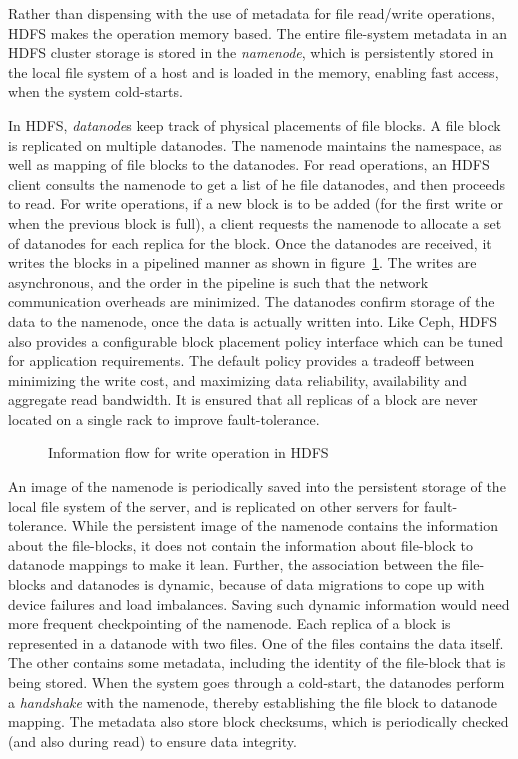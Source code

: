 Rather than dispensing with the use of metadata for file read/write operations, HDFS makes the operation memory based.
The entire file-system metadata in an HDFS cluster storage is stored in the {\em namenode}, which is persistently stored
in the local file system of a host and is loaded in the memory, enabling fast access, when the system cold-starts. 

In HDFS, {\em datanode}s keep track of physical placements of file blocks. A file block is replicated on multiple datanodes.  
The namenode maintains the namespace, as well as mapping of file blocks to the datanodes. For read operations, an HDFS client 
consults the namenode to get a list of he file datanodes, and then proceeds to read. For write operations, if a new block is
to be added (for the first write or when the previous block is full), a client requests the namenode to allocate a set of 
datanodes for each replica for the block. Once the datanodes are received, it writes the blocks in 
a pipelined manner as shown in figure~\ref{fig:bigdata:hdfs}. The writes are asynchronous, and the order in the pipeline is
such that the network communication overheads are minimized. The datanodes confirm storage of the data to the namenode,
once the data is actually written into. Like Ceph, HDFS also provides a configurable block placement policy interface which 
can be tuned for application requirements. The default policy provides a tradeoff between minimizing the write cost, and 
maximizing data reliability, availability and aggregate read bandwidth. It is ensured that all replicas of a block are never 
located on a single rack to improve fault-tolerance.

\begin{figure}[htbp!]
	\centerline{
	}
	\caption{Information flow for write operation in HDFS} 
	\label{fig:bigdata:hdfs}
\end{figure}


An image of the namenode is periodically saved into the persistent storage of the local file system of the server, and is replicated
on other servers for fault-tolerance. While the persistent image of the namenode contains the information about the file-blocks, it 
does not contain the information about file-block to datanode mappings to make it lean. Further, the association between the file-blocks 
and datanodes is dynamic, because of data migrations to cope up with device failures and load imbalances. Saving such dynamic information
would need more frequent checkpointing of the namenode.
%
Each replica of a block is represented in a datanode with two files. One of the files contains the data itself. The other contains 
some metadata, including the identity of the file-block that is being stored. When the system goes through a cold-start, the datanodes 
perform a {\em handshake} with the namenode, thereby establishing the file block to datanode mapping. The metadata also store block
checksums, which is periodically checked (and also during read) to ensure data integrity.

